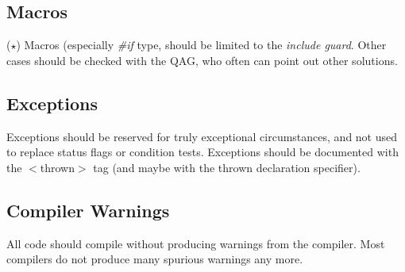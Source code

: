 \subsection {Macros} ($\star$) \bmar
Macros (especially {\it \#if} type, should be limited
   to the {\it include guard}. Other cases should be checked with the QAG,
   who often can point out other solutions.
\subsection {Exceptions}
Exceptions should be reserved for truly exceptional circumstances, and
not used to replace status flags or condition tests. Exceptions should be
documented with the $<$thrown$>$ tag (and maybe with the thrown declaration
specifier). 
\subsection {Compiler Warnings}
All code should compile without producing warnings from the 
\bmar compiler. Most compilers do not produce many spurious warnings any more.

